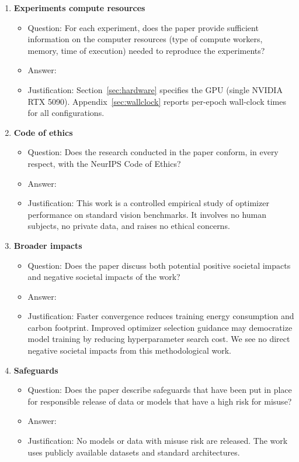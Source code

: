 \documentclass{article}
\begin{document}
\begin{enumerate}
\item {\bf Experiments compute resources}
    \begin{itemize}
        \item[] Question: For each experiment, does the paper provide sufficient information on the computer resources (type of compute workers, memory, time of execution) needed to reproduce the experiments?
        \item[] Answer: \answerYes{}
        \item[] Justification: Section~\ref{sec:hardware} specifies the GPU (single NVIDIA RTX 5090). Appendix~\ref{sec:wallclock} reports per-epoch wall-clock times for all configurations.
    \end{itemize}

\item {\bf Code of ethics}
    \begin{itemize}
        \item[] Question: Does the research conducted in the paper conform, in every respect, with the NeurIPS Code of Ethics?
        \item[] Answer: \answerYes{}
        \item[] Justification: This work is a controlled empirical study of optimizer performance on standard vision benchmarks. It involves no human subjects, no private data, and raises no ethical concerns.
    \end{itemize}

\item {\bf Broader impacts}
    \begin{itemize}
        \item[] Question: Does the paper discuss both potential positive societal impacts and negative societal impacts of the work?
        \item[] Answer: \answerYes{}
        \item[] Justification: Faster convergence reduces training energy consumption and carbon footprint. Improved optimizer selection guidance may democratize model training by reducing hyperparameter search cost. We see no direct negative societal impacts from this methodological work.
    \end{itemize}

\item {\bf Safeguards}
    \begin{itemize}
        \item[] Question: Does the paper describe safeguards that have been put in place for responsible release of data or models that have a high risk for misuse?
        \item[] Answer: \answerNA{}
        \item[] Justification: No models or data with misuse risk are released. The work uses publicly available datasets and standard architectures.
    \end{itemize}


\end{enumerate}
\end{document}
